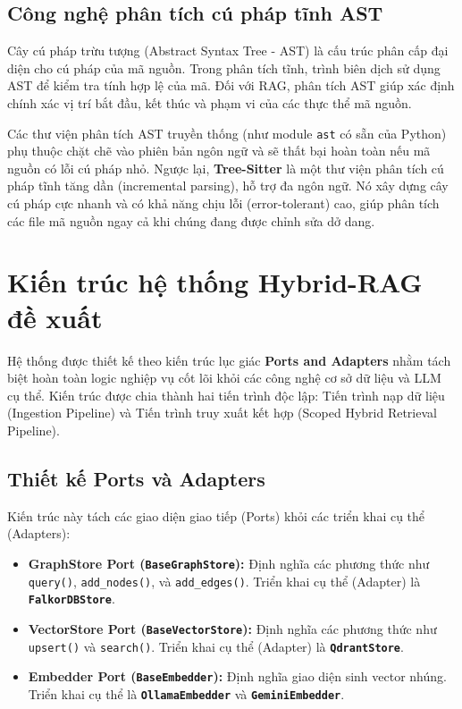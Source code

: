 \documentclass[12pt,a4paper,oneside]{report}
\begin{document}
\section{Công nghệ phân tích cú pháp tĩnh AST}
Cây cú pháp trừu tượng (Abstract Syntax Tree - AST) là cấu trúc phân cấp đại diện cho cú pháp của mã nguồn. Trong phân tích tĩnh, trình biên dịch sử dụng AST để kiểm tra tính hợp lệ của mã. Đối với RAG, phân tích AST giúp xác định chính xác vị trí bắt đầu, kết thúc và phạm vi của các thực thể mã nguồn.

Các thư viện phân tích AST truyền thống (như module \texttt{ast} có sẵn của Python) phụ thuộc chặt chẽ vào phiên bản ngôn ngữ và sẽ thất bại hoàn toàn nếu mã nguồn có lỗi cú pháp nhỏ. Ngược lại, \textbf{Tree-Sitter} là một thư viện phân tích cú pháp tĩnh tăng dần (incremental parsing), hỗ trợ đa ngôn ngữ. Nó xây dựng cây cú pháp cực nhanh và có khả năng chịu lỗi (error-tolerant) cao, giúp phân tích các file mã nguồn ngay cả khi chúng đang được chỉnh sửa dở dang.

\newpage

\chapter{Kiến trúc hệ thống Hybrid-RAG đề xuất}

Hệ thống được thiết kế theo kiến trúc lục giác \textbf{Ports and Adapters} nhằm tách biệt hoàn toàn logic nghiệp vụ cốt lõi khỏi các công nghệ cơ sở dữ liệu và LLM cụ thể. Kiến trúc được chia thành hai tiến trình độc lập: Tiến trình nạp dữ liệu (Ingestion Pipeline) và Tiến trình truy xuất kết hợp (Scoped Hybrid Retrieval Pipeline).

\section{Thiết kế Ports và Adapters}
Kiến trúc này tách các giao diện giao tiếp (Ports) khỏi các triển khai cụ thể (Adapters):
\begin{itemize}
    \item \textbf{GraphStore Port (\texttt{BaseGraphStore}):} Định nghĩa các phương thức như \texttt{query()}, \texttt{add\_nodes()}, và \texttt{add\_edges()}. Triển khai cụ thể (Adapter) là \textbf{\texttt{FalkorDBStore}}.
    \item \textbf{VectorStore Port (\texttt{BaseVectorStore}):} Định nghĩa các phương thức như \texttt{upsert()} và \texttt{search()}. Triển khai cụ thể (Adapter) là \textbf{\texttt{QdrantStore}}.
    \item \textbf{Embedder Port (\texttt{BaseEmbedder}):} Định nghĩa giao diện sinh vector nhúng. Triển khai cụ thể là \textbf{\texttt{OllamaEmbedder}} và \textbf{\texttt{GeminiEmbedder}}.
\end{itemize}
\end{document}
